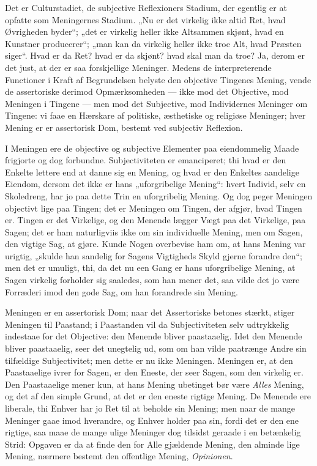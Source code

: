 \documentclass[12pt]{book}
\newcommand{\opage}[1]{\marginnote{\footnotesize\textit{[#1]}}}
\begin{document}
Det er Culturstadiet, de subjective Reflexioners Stadium,
der egentlig er at opfatte som Meningernes Stadium. „Nu er det
virkelig ikke altid Ret, hvad Øvrigheden byder“; „det er virkelig
heller ikke Altsammen skjønt, hvad en Kunstner producerer“; „man
kan da virkelig heller ikke troe Alt, hvad Præsten siger“. Hvad
er da Ret? hvad er da skjønt? hvad skal man da troe? Ja,
derom er det just, at der er saa forskjellige Meninger. Medens
de interpreterende Functioner i Kraft af Begrundelsen belyste
den objective Tingenes Mening, vende de assertoriske derimod
Opmærksomheden --- ikke mod det Objective, mod Meningen
i Tingene --- men mod det Subjective, mod Individernes Meninger
om Tingene: vi faae en Hærskare af politiske, æsthetiske
og religiøse Meninger; hver Mening er er assertorisk Dom,
bestemt ved subjectiv Reflexion.

\opage{196}I Meningen ere de objective og subjective Elementer paa
eiendommelig Maade frigjorte og dog forbundne. Subjectiviteten
er emanciperet; thi hvad er den Enkelte lettere end at danne sig
en Mening, og hvad er den Enkeltes aandelige Eiendom,
dersom det ikke er hans „uforgribelige Mening“: hvert Individ,
selv en Skoledreng, har jo paa dette Trin en uforgribelig
Mening. Og dog peger Meningen objectivt lige paa Tingen;
det er Meningen om Tingen, der afgjør, hvad Tingen er.
Tingen er det Virkelige, og den Menende lægger Vægt paa
det Virkelige, paa Sagen; det er ham naturligviis ikke om sin
individuelle Mening, men om Sagen, den vigtige Sag, at gjøre.
Kunde Nogen overbevise ham om, at hans Mening var urigtig,
„skulde han sandelig for Sagens Vigtigheds Skyld gjerne forandre
den“; men det er umuligt, thi, da det nu een Gang er
hans uforgribelige Mening, at Sagen virkelig forholder sig saaledes,
som han mener det, saa vilde det jo være Forræderi
imod den gode Sag, om han forandrede sin Mening.

Meningen er en assertorisk Dom; naar det Assertoriske
betones stærkt, stiger Meningen til Paastand; i Paastanden
vil da Subjectiviteten selv udtrykkelig indestaae for det Objective:
den Menende bliver paastaaelig. Idet den Menende
bliver paastaaelig, seer det unegtelig ud, som om han vilde
paatrænge Andre sin tilfældige Subjectivitet; men dette er nu
ikke Meningen. Meningen er, at den Paastaaelige ivrer for
Sagen, er den Eneste, der seer Sagen, som den virkelig er.
Den Paastaaelige mener kun, at hans Mening ubetinget bør være
\emph{Alles} Mening, og det af den simple Grund, at det er den
eneste rigtige Mening. De Menende ere liberale, thi Enhver
har jo Ret til at beholde sin Mening; men naar de mange
Meninger gaae imod hverandre, og Enhver holder paa sin,
fordi det er den ene rigtige, saa maae de mange ulige Meninger
dog tilsidst geraade i en betænkelig Strid: Opgaven
er da at finde den for Alle gjældende Mening, den alminde%
\opage{197}lige Mening, nærmere bestemt den offentlige Mening, \emph{Opinionen}.
\end{document}

